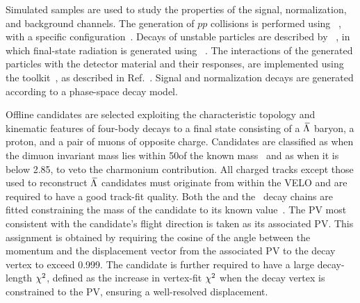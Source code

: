 Simulated samples are used to study the properties of the signal, normalization, and background channels.
The generation of $pp$ collisions is performed using \pythia~\cite{Sjostrand:2007gs}, with a specific \lhcb configuration~\cite{LHCb-PROC-2010-056}. Decays of unstable particles are described by \evtgen~\cite{Lange:2001uf}, in which final-state radiation is generated using \photos~\cite{davidson2015photos}.
The interactions of the generated particles with the detector material and their responses, are implemented using the \geant toolkit~\cite{Agostinelli:2002hh,Allison:2006ve}, as described in Ref.~\cite{LHCb-PROC-2011-006}.
Signal and normalization decays are generated according to a phase-space decay model.



Offline candidates are selected exploiting the characteristic topology and kinematic features of four-body decays to a final state consisting of a ${\kern 0.18em\overline{\kern -0.18em \Lambda}}$ baryon, a proton, and a pair of muons of opposite charge.
Candidates are classified as \btjpsilp when the dimuon invariant mass lies within 50\mevcc of the known \jpsi mass~\cite{PDG2024} and as \btlpmm when it is below 2.85\gevcc, to veto the charmonium contribution.
All charged tracks except those used to reconstruct ${\kern 0.18em\overline{\kern -0.18em \Lambda}}$ candidates must originate from within the VELO and are required to have a good track-fit quality. Both the \btlpmm and the \btjpsilp~decay chains are fitted constraining the mass of the \Lbar candidate to its known value~\cite{PDG2024}. The PV most consistent with the \Bp candidate’s flight direction is taken as its associated PV. This assignment is obtained by requiring the cosine of the angle between the \Bp momentum and the displacement vector from the associated PV to the decay vertex to exceed 0.999. The \Bp candidate is further required to have a large decay-length
$\chi^2$, defined as the increase in vertex-fit $\chi^2$ when the decay vertex is constrained to the PV,
ensuring a well-resolved displacement.




